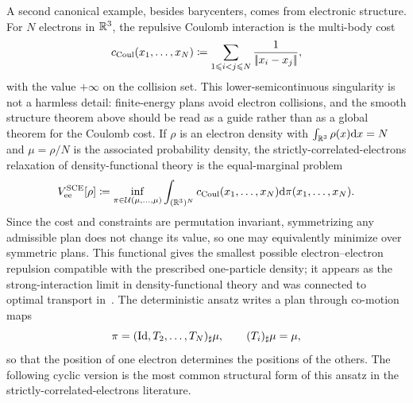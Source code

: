 A second canonical example, besides barycenters, comes from electronic structure. For $N$ electrons in $\mathbb{R}^3$, the repulsive Coulomb interaction is the multi-body cost
\[
	c_{\mathrm{Coul}}(x_1,\ldots,x_N)
	\coloneqq
	\sum_{1\leqslant i<j\leqslant N}\frac{1}{|\!| x_i-x_j |\!|},
\]
with the value $+\infty$ on the collision set. This lower-semicontinuous singularity is not a harmless detail: finite-energy plans avoid electron collisions, and the smooth structure theorem above should be read as a guide rather than as a global theorem for the Coulomb cost. If $\rho$ is an electron density with $\int_{\mathbb{R}^3}\rho(x)\mathrm{d} x=N$ and $\mu=\rho/N$ is the associated probability density, the strictly-correlated-electrons relaxation of density-functional theory is the equal-marginal problem
\[
	V_{\mathrm{ee}}^{\mathrm{SCE}}[\rho]
	\coloneqq
	\inf_{\pi\in\mathcal{U}(\mu,\ldots,\mu)}
	\int_{(\mathbb{R}^3)^N}
	c_{\mathrm{Coul}}(x_1,\ldots,x_N)
	\mathrm{d}\pi(x_1,\ldots,x_N).
\]
Since the cost and constraints are permutation invariant, symmetrizing any admissible plan does not change its value, so one may equivalently minimize over symmetric plans. This functional gives the smallest possible electron--electron repulsion compatible with the prescribed one-particle density; it appears as the strong-interaction limit in density-functional theory and was connected to optimal transport in~\cite{GorSeiVig,BuDePGor,CotarDFT,DiMarinoGerolinNennaRepulsiveCosts}. The deterministic ansatz writes a plan through co-motion maps
\[
	\pi=(\mathrm{Id},T_2,\ldots,T_N)_\sharp\mu,
	\qquad
	(T_i)_\sharp\mu=\mu,
\]
so that the position of one electron determines the positions of the others. The following cyclic version is the most common structural form of this ansatz in the strictly-correlated-electrons literature.

